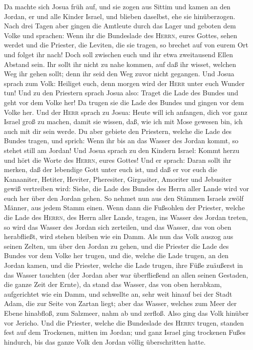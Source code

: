  Da machte sich Josua früh auf, und sie zogen aus Sittim
und kamen an den Jordan, er und alle Kinder Israel, und blieben
daselbst, ehe sie hinüberzogen.  Nach drei Tagen aber
gingen die Amtleute durch das Lager  und geboten dem Volke
und sprachen: Wenn ihr die Bundeslade des \textsc{Herrn}, eures Gottes,
sehen werdet und die Priester, die Leviten, die sie tragen, so brechet
auf von eurem Ort und folget ihr nach!  Doch soll zwischen
euch und ihr etwa zweitausend Ellen Abstand sein. Ihr sollt ihr nicht zu
nahe kommen, auf daß ihr wisset, welchen Weg ihr gehen sollt; denn ihr
seid den Weg zuvor nicht gegangen.  Und Josua sprach zum
Volk: Heiliget euch, denn morgen wird der \textsc{Herr} unter euch
Wunder tun!  Und zu den Priestern sprach Josua also:
Traget die Lade des Bundes und geht vor dem Volke her! Da trugen sie die
Lade des Bundes und gingen vor dem Volke her.  Und der
\textsc{Herr} sprach zu Josua: Heute will ich anfangen, dich vor ganz
Israel groß zu machen, damit sie wissen, daß, wie ich mit Mose gewesen
bin, ich auch mit dir sein werde.  Du aber gebiete den
Priestern, welche die Lade des Bundes tragen, und sprich: Wenn ihr bis
an das Wasser des Jordan kommt, so stehet still am Jordan!
 Und Josua sprach zu den Kindern Israel: Kommt herzu und
hört die Worte des \textsc{Herrn}, eures Gottes!  Und er
sprach: Daran sollt ihr merken, daß der lebendige Gott unter euch ist,
und daß er vor euch die Kanaaniter, Hetiter, Heviter, Pheresiter,
Girgasiter, Amoriter und Jebusiter gewiß vertreiben wird:
 Siehe, die Lade des Bundes des Herrn aller Lande wird
vor euch her über den Jordan gehen.  So nehmet nun aus
den Stämmen Israels zwölf Männer, aus jedem Stamm einen. 
Wenn dann die Fußsohlen der Priester, welche die Lade des
\textsc{Herrn}, des Herrn aller Lande, tragen, ins Wasser des Jordan
treten, so wird das Wasser des Jordan sich zerteilen, und das Wasser,
das von oben herabfließt, wird stehen bleiben wie ein Damm.
 Als nun das Volk auszog aus seinen Zelten, um über den
Jordan zu gehen, und die Priester die Lade des Bundes vor dem Volke her
trugen,  und die, welche die Lade trugen, an den Jordan
kamen, und die Priester, welche die Lade trugen, ihre Füße zuäußerst in
das Wasser tauchten (der Jordan aber war überfließend an allen seinen
Gestaden, die ganze Zeit der Ernte),  da stand das
Wasser, das von oben herabkam, aufgerichtet wie ein Damm, und schwellte
an, sehr weit hinauf bei der Stadt Adam, die zur Seite von Zartan liegt;
aber das Wasser, welches zum Meer der Ebene hinabfloß, zum Salzmeer,
nahm ab und zerfloß. Also ging das Volk hinüber vor Jericho.
 Und die Priester, welche die Bundeslade des
\textsc{Herrn} trugen, standen fest auf dem Trockenen, mitten im Jordan;
und ganz Israel ging trockenen Fußes hindurch, bis das ganze Volk den
Jordan völlig überschritten hatte.

